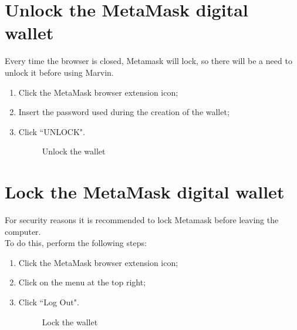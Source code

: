 \documentclass[ManualeUtente.tex]{subfiles}
\begin{document}
\section{Unlock the MetaMask digital wallet}
Every time the browser is closed, Metamask will lock, so there will be a need to unlock it before using Marvin.
\begin{enumerate}
	\item Click the MetaMask browser extension icon;
	\item Insert the password used during the creation of the wallet;
	\item Click \textquotedblleft UNLOCK".
	\begin{figure}[H]
		\centering
		\caption{Unlock the wallet}
		\label{fig:Unlock the wallet}
	\end{figure}
\end{enumerate}

\section{Lock the MetaMask digital wallet}
For security reasons it is recommended to lock Metamask before leaving the computer. \\
To do this, perform the following steps:
\begin{enumerate}
	\item Click the MetaMask browser extension icon;
	\item Click on the menu at the top right;
	\item Click \textquotedblleft Log Out".
	\begin{figure}[H]
		\centering
		\caption{Lock the wallet}
		\label{fig:Lock the wallet}
	\end{figure}
\end{enumerate}
\end{document}
